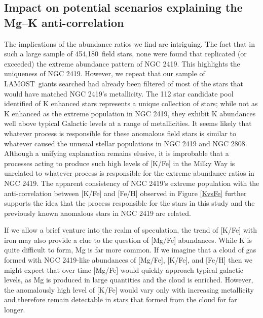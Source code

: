 \documentclass[a4paper,fleqn,usenatbib]{mnras}
\newcommand{\LamostGiants}{454,180}
\newcommand{\project}[1]{#1}
\newcommand{\lamost}{\project{LAMOST}}
\begin{document}


\subsection{Impact on potential scenarios explaining the Mg--K anti-correlation}

The implications of the abundance ratios we find are intriguing. The fact that in such a large sample of \LamostGiants\ field stars, none were found that replicated (or exceeded) the extreme abundance pattern of NGC 2419. This highlights the uniqueness of NGC 2419.
However, we repeat that our sample of \lamost\ giants searched had already been filtered of most of the stars that would have matched NGC 2419's metallicity. The 112 star candidate pool identified of K enhanced stars represents a unique collection of stars; while not as K enhanced as the extreme population in NGC 2419, they exhibit K abundances well above typical Galactic levels at a range of metallicities. It seems likely that whatever process is responsible for these anomalous field stars is similar to whatever caused the unusual stellar populations in NGC 2419 and NGC 2808.  Although a unifying explanation remains elusive, it is improbable that a processes acting to produce such high levels of [K/Fe] in the Milky Way is unrelated to whatever process is responsible for the extreme abundance ratios in NGC 2419. The apparent consistency of NGC 2419's extreme population with the anti-correlation between [K/Fe] and [Fe/H] observed in Figure \ref{KvsFe} further supports the idea that the process responsible for the stars in this study and the previously known anomalous stars in NGC 2419 are related.

If we allow a brief venture into the realm of speculation, the trend of [K/Fe] with iron may also provide a clue to the question of [Mg/Fe] abundances. While K is quite difficult to form, Mg is far more common. If we imagine that a cloud of gas formed with NGC 2419-like abundances of [Mg/Fe], [K/Fe], and [Fe/H] then we might expect that over time [Mg/Fe] would quickly approach typical galactic levels, as Mg is produced in large quantities and the cloud is enriched. However, the anomalously high level of [K/Fe] would vary only with increasing metallicity and therefore remain detectable in stars that formed from the cloud for far longer.
\end{document}
